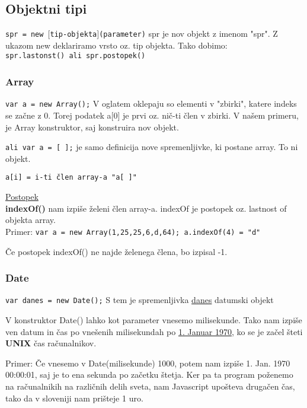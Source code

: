 \subsection{Objektni tipi}

\texttt{spr = new $[$tip-objekta$]$(parameter)}
spr je nov objekt z imenom "spr". Z ukazom new deklariramo vrsto oz. tip objekta. Tako dobimo:\\
\texttt{spr.lastonst() ali spr.postopek()}

\subsubsection*{Array}

\texttt{var a = new Array();}
V oglatem oklepaju so elementi v "zbirki", katere indeks se začne z 0. Torej podatek a[0] je prvi oz. nič-ti člen v zbirki.
V našem primeru, je Array konstruktor, saj konstruira nov objekt.

\texttt{ali var a = [ ];} je samo definicija nove spremenljivke, ki postane array. To ni objekt.

\texttt{a[i] = i-ti člen array-a "a[ ]"}

\underline{Postopek}\\
\textbf{indexOf()} nam izpiše želeni člen array-a. indexOf je postopek oz. lastnost of objekta array.\\
Primer:
\texttt{var a = new Array(1,25,25,6,d,64); a.indexOf(4) = "d"}

Če postopek indexOf() ne najde želenega člena, bo izpisal -1.

\subsubsection*{Date}

\texttt{var danes = new Date();} S tem je spremenljivka \underline{danes} datumski objekt

V konstruktor Date() lahko kot parameter vnesemo milisekunde. Tako nam izpiše ven datum in čas po vnešenih milisekundah po \underline{1. Januar 1970}, ko se je začel šteti \textbf{UNIX} čas računalnikov.

Primer: Če vnesemo v Date(milisekunde) 1000, potem nam izpiše 1. Jan. 1970 00:00:01, saj je to ena sekunda po začetku štetja. Ker pa ta program poženemo na računalnikih na različnih delih sveta, nam Javascript upošteva drugačen čas, tako da v sloveniji nam prišteje 1 uro.

